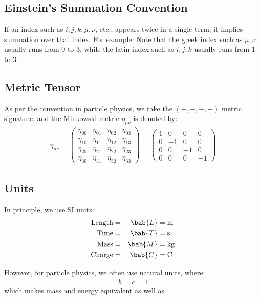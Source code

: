 \subsection{Einstein's Summation Convention}
If an index such as $i, j, k, \mu, \nu$, etc., appears twice in a single term, it implies summation over that index. For example:
Note that the greek index such as $\mu, \nu$ usually runs from $0$ to $3$, while the latin index such as $i, j, k$ usually runs from $1$ to $3$.

\subsection{Metric Tensor}
As per the convention in particle physics, we take the $(+, -, -, -)$ metric signature, and the Minkowski metric $\eta_{\mu \nu}$ is denoted by:
\begin{align}
  \eta_{\mu \nu}
  = \begin{pmatrix}
      \eta_{00} & \eta_{01} & \eta_{02} & \eta_{03} \\
      \eta_{10} & \eta_{11} & \eta_{12} & \eta_{13} \\
      \eta_{20} & \eta_{21} & \eta_{22} & \eta_{23} \\
      \eta_{30} & \eta_{31} & \eta_{32} & \eta_{33}
    \end{pmatrix}
  = \begin{pmatrix}
      1 & 0  & 0  & 0  \\
      0 & -1 & 0  & 0  \\
      0 & 0  & -1 & 0  \\
      0 & 0  & 0  & -1
    \end{pmatrix}
\end{align}

\subsection{Units}
In principle, we use SI units:
\begin{alignat}{2}
  \text{Length} & = & \bab{L} & = \si{\meter}    \\
  \text{Time}   & = & \bab{T} & = \si{\second}   \\
  \text{Mass}   & = & \bab{M} & = \si{\kilogram} \\
  \text{Charge} & = & \bab{C} & = \si{\coulomb}
\end{alignat}

However, for particle physics, we often use natural units, where:
\begin{align}
  \hbar = c = 1
\end{align}
which makes mass and energy equivalent as well as